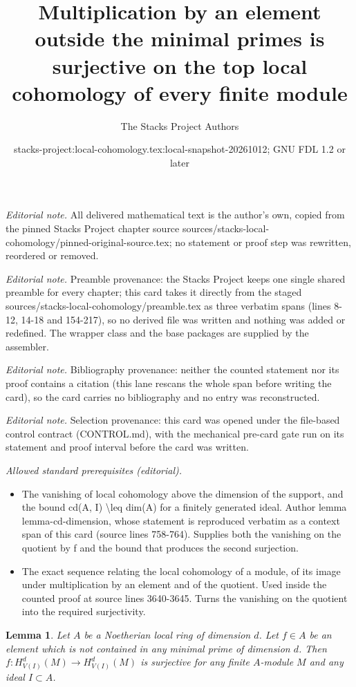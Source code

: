 \documentclass[10pt,a4paper]{amsart}
\title{Multiplication by an element outside the minimal primes is surjective on the top local cohomology of every finite module}
\author{The Stacks Project Authors}
\date{stacks-project:local-cohomology.tex:local-snapshot-20261012; GNU FDL 1.2 or later}
\theoremstyle{plain}
\newtheorem{lemma}[subsection]{Lemma}
\theoremstyle{definition}
\theoremstyle{remark}
\numberwithin{equation}{subsection}
\begin{document}
\maketitle
\noindent\textit{Editorial note.} All delivered mathematical text is the author's own, copied from the pinned Stacks Project chapter source sources/stacks-local-cohomology/pinned-original-source.tex; no statement or proof step was rewritten, reordered or removed.\par\medskip
\noindent\textit{Editorial note.} Preamble provenance: the Stacks Project keeps one single shared preamble for every chapter; this card takes it directly from the staged sources/stacks-local-cohomology/preamble.tex as three verbatim spans (lines 8-12, 14-18 and 154-217), so no derived file was written and nothing was added or redefined. The wrapper class and the base packages are supplied by the assembler.\par\medskip
\noindent\textit{Editorial note.} Bibliography provenance: neither the counted statement nor its proof contains a citation (this lane rescans the whole span before writing the card), so the card carries no bibliography and no entry was reconstructed.\par\medskip
\noindent\textit{Editorial note.} Selection provenance: this card was opened under the file-based control contract (CONTROL.md), with the mechanical pre-card gate run on its statement and proof interval before the card was written.\par\medskip
\noindent\textit{Allowed standard prerequisites (editorial).}\begin{itemize}
\item The vanishing of local cohomology above the dimension of the support, and the bound cd(A, I) \textbackslash{}leq dim(A) for a finitely generated ideal. Author lemma lemma-cd-dimension, whose statement is reproduced verbatim as a context span of this card (source lines 758-764). Supplies both the vanishing on the quotient by f and the bound that produces the second surjection.
\item The exact sequence relating the local cohomology of a module, of its image under multiplication by an element and of the quotient. Used inside the counted proof at source lines 3640-3645. Turns the vanishing on the quotient into the required surjectivity.
\end{itemize}\medskip
\begin{lemma}
\label{lemma-top-coh-divisible}
Let $A$ be a Noetherian local ring of dimension $d$. Let $f \in A$
be an element which is not contained in any minimal prime of
dimension $d$. Then $f : H^d_{V(I)}(M) \to H^d_{V(I)}(M)$
is surjective for any finite $A$-module $M$ and any ideal $I \subset A$.
\end{lemma}
\end{document}

